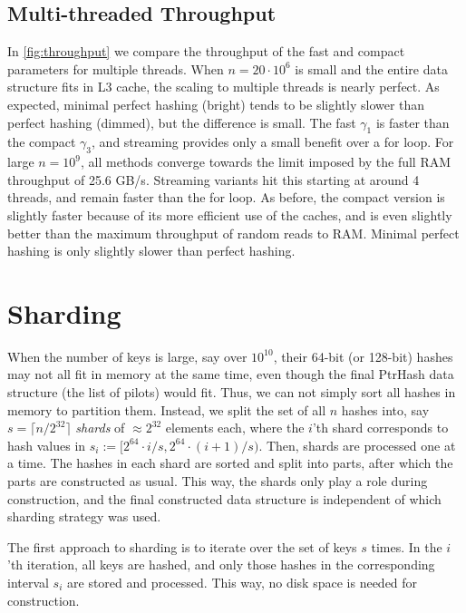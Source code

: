 \documentclass[a4paper,UKenglish,cleveref,thm-restate]{lipics-v2021}
\begin{document}
\subsection{Multi-threaded Throughput}
\label{sec:org6cfc145}

In \cref{fig:throughput} we compare the throughput of the fast and compact parameters for
multiple threads. When \(n=20\cdot 10^6\) is small and the entire data structure
fits in L3 cache, the scaling to multiple threads is nearly perfect. As
expected, minimal perfect hashing (bright) tends to be slightly slower than
perfect hashing (dimmed), but the difference is small. The fast \(\gamma_1\) is faster than
the compact \(\gamma_3\), and streaming provides only a small benefit over a for
loop.
For large \(n=10^9\), all methods converge towards the limit imposed by the full
RAM throughput of 25.6 GB/s. Streaming variants hit this starting at around 4
threads, and remain faster than the for loop. As before, the compact version is
slightly faster because of its more efficient use of the caches, and is even
slightly better than the maximum throughput of random reads to RAM.
Minimal perfect hashing is only slightly slower than perfect hashing.

\section{Sharding}
\label{sharding}
When the number of keys is large, say over \(10^{10}\), their 64-bit (or 128-bit) hashes may not all fit
in memory at the same time, even though the final PtrHash data structure (the
list of pilots) would fit. Thus, we can not simply sort all hashes in
memory to partition them. Instead, we split the set of all \(n\) hashes into, say
\(s=\lceil n/2^{32}\rceil\) \emph{shards} of \(\approx 2^{32}\) elements each,
where the \(i\)'th shard corresponds to hash values in \(s_i:=[2^{64}\cdot i/s,
2^{64}\cdot (i+1)/s)\).
Then, shards are processed one at a time. The hashes in each shard are
sorted and split into parts, after which the parts are constructed as usual.
This way, the shards only play a role during construction, and the final
constructed data structure is independent of which sharding strategy was used.

The first approach to sharding is to iterate over the set of keys \(s\) times.
In the \(i\)'th iteration, all keys are hashed, and only those hashes in the
corresponding interval \(s_i\) are stored and processed.
This way, no disk space is needed for construction.
\end{document}

